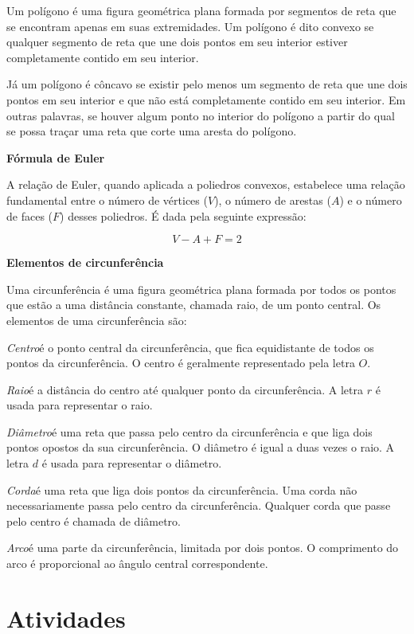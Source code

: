 {Um polígono é uma figura geométrica plana formada por segmentos de reta
que se encontram apenas em suas extremidades. Um polígono é dito convexo
se qualquer segmento de reta que une dois pontos em seu interior estiver
completamente contido em seu interior.

Já um polígono é côncavo se existir pelo menos um segmento de reta que
une dois pontos em seu interior e que não está completamente contido em
seu interior. Em outras palavras, se houver algum ponto no interior do
polígono a partir do qual se possa traçar uma reta que corte uma aresta
do polígono.

\pagebreak
\textbf{Fórmula de Euler}

\noindent A relação de Euler, quando aplicada a poliedros convexos, estabelece uma
relação fundamental entre o número de vértices ($V$), o número de arestas ($A$) e o
número de faces ($F$) desses poliedros. É dada pela seguinte expressão:

$$V - A + F = 2$$

\textbf{Elementos de circunferência}

\noindent Uma circunferência é uma figura geométrica plana formada por todos os
pontos que estão a uma distância constante, chamada raio, de um ponto
central. Os elementos de uma circunferência são:

\noindent\textit{Centro}\quad é o ponto central da circunferência, que fica equidistante de
todos os pontos da circunferência. O centro é geralmente representado
pela letra $O$.

\noindent\textit{Raio}\quad é a distância do centro até qualquer ponto da
circunferência. A letra $r$ é usada para representar o raio.

\noindent\textit{Diâmetro}\quad é uma reta que passa pelo centro da circunferência e que liga
dois pontos opostos da sua circunferência. O diâmetro é igual a duas
vezes o raio. A letra $d$ é usada para representar o diâmetro.

\noindent\textit{Corda}\quad é uma reta que liga dois pontos da circunferência. Uma corda não
necessariamente passa pelo centro da circunferência. Qualquer corda que
passe pelo centro é chamada de diâmetro.

\noindent\textit{Arco}\quad é uma parte da circunferência, limitada por dois pontos. O
comprimento do arco é proporcional ao ângulo central correspondente.}

\section*{Atividades}


